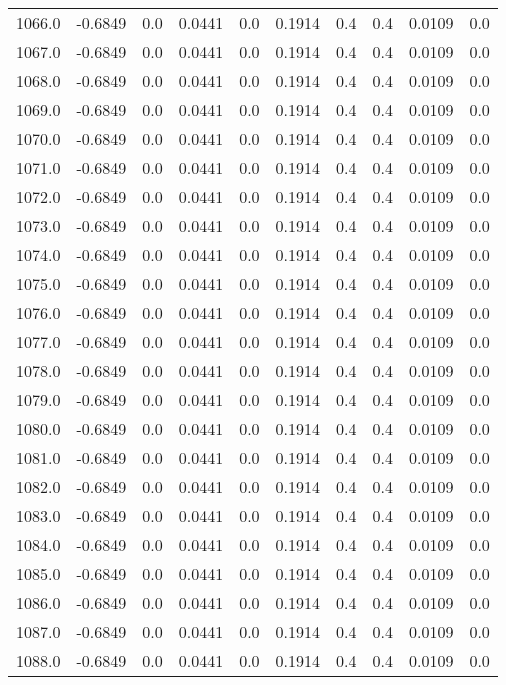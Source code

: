 \begin{longtable}{lrrrrrrrrr}
1066.0 & -0.6849 & 0.0 & 0.0441 & 0.0 & 0.1914 & 0.4 & 0.4 & 0.0109 & 0.0 \\
1067.0 & -0.6849 & 0.0 & 0.0441 & 0.0 & 0.1914 & 0.4 & 0.4 & 0.0109 & 0.0 \\
1068.0 & -0.6849 & 0.0 & 0.0441 & 0.0 & 0.1914 & 0.4 & 0.4 & 0.0109 & 0.0 \\
1069.0 & -0.6849 & 0.0 & 0.0441 & 0.0 & 0.1914 & 0.4 & 0.4 & 0.0109 & 0.0 \\
1070.0 & -0.6849 & 0.0 & 0.0441 & 0.0 & 0.1914 & 0.4 & 0.4 & 0.0109 & 0.0 \\
1071.0 & -0.6849 & 0.0 & 0.0441 & 0.0 & 0.1914 & 0.4 & 0.4 & 0.0109 & 0.0 \\
1072.0 & -0.6849 & 0.0 & 0.0441 & 0.0 & 0.1914 & 0.4 & 0.4 & 0.0109 & 0.0 \\
1073.0 & -0.6849 & 0.0 & 0.0441 & 0.0 & 0.1914 & 0.4 & 0.4 & 0.0109 & 0.0 \\
1074.0 & -0.6849 & 0.0 & 0.0441 & 0.0 & 0.1914 & 0.4 & 0.4 & 0.0109 & 0.0 \\
1075.0 & -0.6849 & 0.0 & 0.0441 & 0.0 & 0.1914 & 0.4 & 0.4 & 0.0109 & 0.0 \\
1076.0 & -0.6849 & 0.0 & 0.0441 & 0.0 & 0.1914 & 0.4 & 0.4 & 0.0109 & 0.0 \\
1077.0 & -0.6849 & 0.0 & 0.0441 & 0.0 & 0.1914 & 0.4 & 0.4 & 0.0109 & 0.0 \\
1078.0 & -0.6849 & 0.0 & 0.0441 & 0.0 & 0.1914 & 0.4 & 0.4 & 0.0109 & 0.0 \\
1079.0 & -0.6849 & 0.0 & 0.0441 & 0.0 & 0.1914 & 0.4 & 0.4 & 0.0109 & 0.0 \\
1080.0 & -0.6849 & 0.0 & 0.0441 & 0.0 & 0.1914 & 0.4 & 0.4 & 0.0109 & 0.0 \\
1081.0 & -0.6849 & 0.0 & 0.0441 & 0.0 & 0.1914 & 0.4 & 0.4 & 0.0109 & 0.0 \\
1082.0 & -0.6849 & 0.0 & 0.0441 & 0.0 & 0.1914 & 0.4 & 0.4 & 0.0109 & 0.0 \\
1083.0 & -0.6849 & 0.0 & 0.0441 & 0.0 & 0.1914 & 0.4 & 0.4 & 0.0109 & 0.0 \\
1084.0 & -0.6849 & 0.0 & 0.0441 & 0.0 & 0.1914 & 0.4 & 0.4 & 0.0109 & 0.0 \\
1085.0 & -0.6849 & 0.0 & 0.0441 & 0.0 & 0.1914 & 0.4 & 0.4 & 0.0109 & 0.0 \\
1086.0 & -0.6849 & 0.0 & 0.0441 & 0.0 & 0.1914 & 0.4 & 0.4 & 0.0109 & 0.0 \\
1087.0 & -0.6849 & 0.0 & 0.0441 & 0.0 & 0.1914 & 0.4 & 0.4 & 0.0109 & 0.0 \\
1088.0 & -0.6849 & 0.0 & 0.0441 & 0.0 & 0.1914 & 0.4 & 0.4 & 0.0109 & 0.0 \\

\end{longtable}

